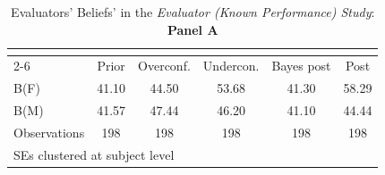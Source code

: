 \begin{table}[htbp]\centering
\caption{Evaluators' Beliefs' in the \textit{Evaluator (Known Performance) Study}: \textbf{Panel A}}
\begin{tabular}{l*{5}{c}}
\hline\hline
                &\multicolumn{5}{c}{}                             \\\cmidrule(lr){2-6}
                &\multicolumn{1}{c}{Prior}&\multicolumn{1}{c}{Overconf.}&\multicolumn{1}{c}{Undercon.}&\multicolumn{1}{c}{Bayes post}&\multicolumn{1}{c}{Post}\\
\hline
B(F)            &    41.10&    44.50&    53.68&    41.30&    58.29\\
B(M)            &    41.57&    47.44&    46.20&    41.10&    44.44\\
\hline
Observations    &      198&      198&      198&      198&      198\\
\hline\hline
\multicolumn{6}{l}{\footnotesize SEs clustered at subject level}\\
\end{tabular}
\end{table}
